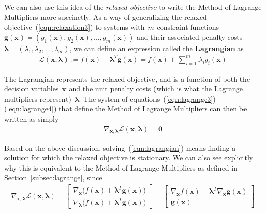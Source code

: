 \documentclass[11pt]{article}
\theoremstyle{definition} %
\begin{document}
We can also use this idea of the \textit{relaxed objective} to write the Method of Lagrange Multipliers more succinctly. As a way of generalizing the relaxed objective~(\ref{eqn:relaxation3}) to systems with~$m$ constraint functions~$\mathbf{g}(\mathbf{x}) = (g_1(\mathbf{x}),g_2(\mathbf{x}),\dots,g_m(\mathbf{x}))$ and their associated penalty costs~$\boldsymbol{\lambda} = (\lambda_1,\lambda_2,\dots,\lambda_m)$, we can define an expression called the \textbf{Lagrangian} as
\begin{align*}
	\mathcal{L}(\mathbf{x},\boldsymbol{\lambda}) := f(\mathbf{x}) + \boldsymbol{\lambda}^T \mathbf{g}(\mathbf{x}) = f(\mathbf{x}) + \sum_{i=1}^m \lambda_i g_i(\mathbf{x})
\end{align*}

The Lagrangian represents the relaxed objective, and is a function of both the decision variables~$\mathbf{x}$ and the unit penalty costs (which is what the Lagrange multipliers represent)~$\boldsymbol{\lambda}$. The system of equations~(\ref{eqn:lagrange3})--(\ref{eqn:lagrange4}) that define the Method of Lagrange Multipliers can then be written as simply
\begin{align}
	\label{eqn:lagrangian} \nabla_{\mathbf{x},\boldsymbol{\lambda}} \mathcal{L}(\mathbf{x},\boldsymbol{\lambda}) = \mathbf{0}
\end{align}

Based on the above discussion, solving~(\ref{eqn:lagrangian}) means finding a solution for which the relaxed objective is stationary. We can also see explicitly why this is equivalent to the Method of Lagrange Multipliers as defined in Section~\ref{subsec:lagrange}, since
\begin{align}
	\label{eqn:lagrangeblock} \nabla_{\mathbf{x},\boldsymbol{\lambda}} \mathcal{L}(\mathbf{x},\boldsymbol{\lambda}) = \begin{bmatrix}
		\nabla_{\mathbf{x}} \big( f(\mathbf{x}) + \boldsymbol{\lambda}^T \mathbf{g}(\mathbf{x}) \big) \\
		\nabla_{\boldsymbol{\lambda}} \big( f(\mathbf{x}) + \boldsymbol{\lambda}^T \mathbf{g}(\mathbf{x}) \big)
	\end{bmatrix} = \begin{bmatrix}
		\nabla_{\mathbf{x}} f(\mathbf{x}) + \boldsymbol{\lambda}^T \nabla_{\mathbf{x}} \mathbf{g}(\mathbf{x}) \\
		\mathbf{g}(\mathbf{x})
	\end{bmatrix}
\end{align}
\end{document}
